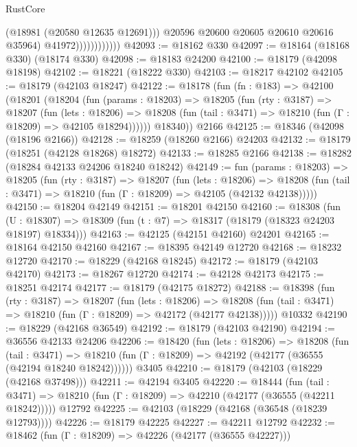 \begin{lexlean}{RustCore}
\begin{coremodule}
                                (@18981 (@20580 @12635 @12691)))
                              @20596
                              @20600
                              @20605
                              @20610
                              @20616
                              @35964)
                            @41972))))))))))))
@42093 := @18162 @330
@42097 := @18164 (@18168 @330) (@18174 @330)
@42098 := @18183 @24200
@42100 := @18179 (@42098 @18198)
@42102 := @18221 (@18222 @330)
@42103 := @18217 @42102
@42105 := @18179 (@42103 @18247)
@42122 := @18178
    (fun (fn : @183) =>
    @42100
      (@18201
        (@18204
          (fun (params : @18203) =>
          @18205
            (fun (rty : @3187) =>
            @18207
              (fun (lets : @18206) =>
              @18208 (fun (tail : @3471) => @18210 (fun (Γ : @18209) => @42105 @18294))))))
        @18340))
    @2166
@42125 := @18346 (@42098 (@18196 @2166))
@42128 := @18259 (@18260 @2166) @24203
@42132 := @18179 (@18251 (@42128 @18268) @18272)
@42133 := @18285 @2166
@42138 := @18282 (@18284 @42133 @24206 @18240 @18242)
@42149 := fun (params : @18203) =>
  @18205
    (fun (rty : @3187) =>
    @18207
      (fun (lets : @18206) =>
      @18208 (fun (tail : @3471) => @18210 (fun (Γ : @18209) => @42105 (@42132 @42138)))))
@42150 := @18204 @42149
@42151 := @18201 @42150
@42160 := @18308
    (fun (U : @18307) => @18309 (fun (t : @7) => @18317 (@18179 (@18323 @24203 @18197) @18334)))
@42163 := @42125 (@42151 @42160) @24201
@42165 := @18164 @42150 @42160
@42167 := @18395 @42149 @12720
@42168 := @18232 @12720
@42170 := @18229 (@42168 @18245)
@42172 := @18179 (@42103 @42170)
@42173 := @18267 @12720
@42174 := @42128 @42173
@42175 := @18251 @42174
@42177 := @18179 (@42175 @18272)
@42188 := @18398
    (fun (rty : @3187) =>
    @18207
      (fun (lets : @18206) =>
      @18208 (fun (tail : @3471) => @18210 (fun (Γ : @18209) => @42172 (@42177 @42138)))))
    @10332
@42190 := @18229 (@42168 @36549)
@42192 := @18179 (@42103 @42190)
@42194 := @36556 @42133 @24206
@42206 := @18420
    (fun (lets : @18206) =>
    @18208
      (fun (tail : @3471) =>
      @18210 (fun (Γ : @18209) => @42192 (@42177 (@36555 (@42194 @18240 @18242))))))
    @3405
@42210 := @18179 (@42103 (@18229 (@42168 @37498)))
@42211 := @42194 @3405
@42220 := @18444
    (fun (tail : @3471) => @18210 (fun (Γ : @18209) => @42210 (@42177 (@36555 (@42211 @18242)))))
    @12792
@42225 := @42103 (@18229 (@42168 (@36548 (@18239 @12793))))
@42226 := @18179 @42225
@42227 := @42211 @12792
@42232 := @18462 (fun (Γ : @18209) => @42226 (@42177 (@36555 @42227)))

\end{coremodule}
\end{lexlean}
